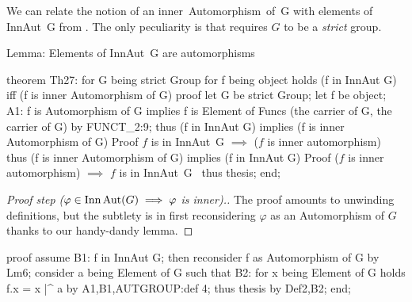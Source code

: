 \begin{thm-remark}
We can relate the notion of an {\Tt{}inner\ Automorphism\ of\ G\nwendquote} with elements
of {\Tt{}InnAut\ G\nwendquote} from . The only peculiarity is that
 requires $G$ to be a \emph{strict} group.
\end{thm-remark}

\nwenddocs{}\endmoddef\nwstartdeflinemarkup{}\nwenddeflinemarkup
\LA{}Lemma: Elements of \code{}InnAut\ G\edoc{} are automorphisms~{\nwtagstyle{}}\RA{}

theorem Th27:
  for G being strict Group
  for f being object
  holds (f in InnAut G) iff (f is inner Automorphism of G)
proof
  let G be strict Group;
  let f be object;
  A1: f is Automorphism of G implies
      f is Element of Funcs (the carrier of G, the carrier of G) by FUNCT_2:9;
  thus (f in InnAut G) implies (f is inner Automorphism of G)
  \LA{}Proof $f$ is in \code{}InnAut\ G\edoc{} $\implies$ ($f$ is inner automorphism)~{\nwtagstyle{}}\RA{}
  thus (f is inner Automorphism of G) implies (f in InnAut G)
  \LA{}Proof ($f$ is inner automorphism) $\implies$ $f$ is in \code{}InnAut\ G\edoc{}~{\nwtagstyle{}}\RA{}
  thus thesis;
end;
\eatline
{}\nwendcode{}\nwdocspar
\begin{proof}[Proof step ($\varphi\in\operatorname{Inn}\operatorname{Aut}(G)\implies\varphi$ is inner).]
The proof amounts to unwinding
definitions, but the subtlety is in first reconsidering $\varphi$ as an
Automorphism of $G$ thanks to our handy-dandy lemma.
\end{proof}

\nwenddocs{}\endmoddef\nwstartdeflinemarkup{}\nwenddeflinemarkup
proof
  assume B1: f in InnAut G;
  then reconsider f as Automorphism of G by Lm6;
  consider a being Element of G such that
  B2: for x being Element of G holds f.x = x |^ a
  by A1,B1,AUTGROUP:def 4;
  thus thesis by Def2,B2;
end;
\nwendcode{}\nwdocspar


